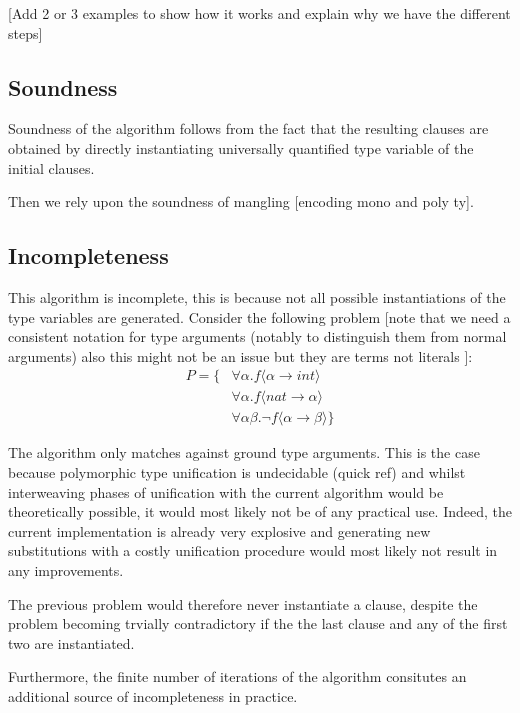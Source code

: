 \documentclass[]{ceurart}
\begin{document}
[Add 2 or 3 examples to show how it works and explain why we have the different steps]

\subsection{Soundness}
Soundness of the algorithm follows from the fact that the resulting clauses are obtained by directly instantiating universally quantified type variable of the initial clauses.

Then we rely upon the soundness of mangling [encoding mono and poly ty].

\subsection{Incompleteness}

This algorithm is incomplete, this is because not all possible instantiations of the type variables are generated.
Consider the following problem [note that we need a consistent notation for type arguments (notably to distinguish them from normal arguments) also this might not be an issue but they are terms not literals ]: 
\begin{align*}
   P = \{ & \forall \alpha. f \langle \alpha \rightarrow int \rangle \\
          & \forall \alpha. f \langle nat \rightarrow \alpha \rangle \\
          & \forall \alpha \beta. \lnot f \langle \alpha \rightarrow \beta \rangle \}
\end{align*}

The algorithm only matches against ground type arguments. This is the case because polymorphic type unification is undecidable (quick ref) and whilst interweaving phases of unification with the current algorithm would be theoretically possible, it would most likely not be of any practical use. Indeed, the current implementation is already very explosive and generating new substitutions with a costly unification procedure would most likely not result in any improvements.


The previous problem would therefore never instantiate a clause, despite the problem becoming trvially contradictory if the the last clause and any of the first two are instantiated.


Furthermore, the finite number of iterations of the algorithm consitutes an additional source of incompleteness in practice.
\end{document}
